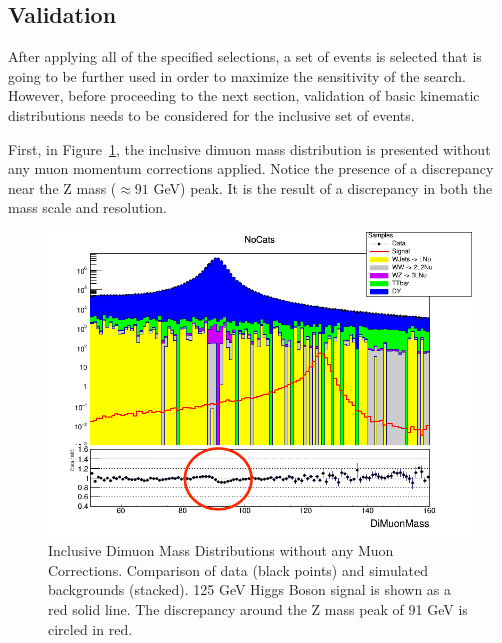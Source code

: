 \subsection{Validation}
After applying all of the specified selections, a set of events is selected that is going to be further used in order to maximize the sensitivity of the search. However, before proceeding to the next section, validation of basic kinematic distributions needs to be considered for the inclusive set of events.

First, in Figure~\ref{fig:higgs_selections_inclusivemassnocorr}, the inclusive dimuon mass distribution is presented without any muon momentum corrections applied. Notice the presence of a discrepancy near the Z mass ($\approx 91$ GeV) peak. It is the result of a discrepancy in both the mass scale and resolution.
\begin{figure}[htbp]
  \centering
  \includegraphics[width=0.5\linewidth]{figures/ch_higgs/distributions/baseline_nocorrections/distribution__NoCats__DiMuonMass__logY.png}
  \caption{Inclusive Dimuon Mass Distributions without any Muon Corrections. Comparison of data (black points) and simulated backgrounds (stacked). 125 GeV Higgs Boson signal is shown as a red solid line. The discrepancy around the Z mass peak of 91 GeV is circled in red.}
  \label{fig:higgs_selections_inclusivemassnocorr}
\end{figure}

